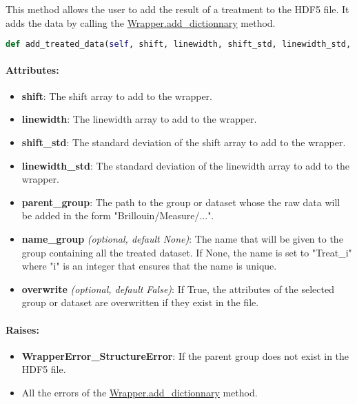 This method allows the user to add the result of a treatment to the HDF5 file. It adds the data by calling the \hyperref[subsec:wrapper.add_dictionnary]{Wrapper.add\_dictionnary} method.

\begin{lstlisting}[language=Python]
def add_treated_data(self, shift, linewidth, shift_std, linewidth_std, parent_group, name_group = None, overwrite = False):
\end{lstlisting}

\paragraph{Attributes:}

\begin{itemize}
    \item \textbf{shift}: The shift array to add to the wrapper. 
    \item \textbf{linewidth}: The linewidth array to add to the wrapper. 
    \item \textbf{shift\_std}: The standard deviation of the shift array to add to the wrapper. 
    \item \textbf{linewidth\_std}: The standard deviation of the linewidth array to add to the wrapper. 
    \item \textbf{parent\_group}: The path to the group or dataset whose the raw data will be added in the form "Brillouin/Measure/...".
    \item \textbf{name\_group} \textit{(optional, default None)}: The name that will be given to the group containing all the treated dataset. If None, the name is set to "Treat\_i" where "i" is an integer that ensures that the name is unique.
    \item \textbf{overwrite} \textit{(optional, default False)}: If True, the attributes of the selected group or dataset are overwritten if they exist in the file.
\end{itemize}

\paragraph{Raises:}
\begin{itemize}
    \item \textbf{WrapperError\_StructureError}: If the parent group does not exist in the HDF5 file.
    \item All the errors of the \hyperref[subsec:wrapper.add_dictionnary]{Wrapper.add\_dictionnary} method.
\end{itemize}
